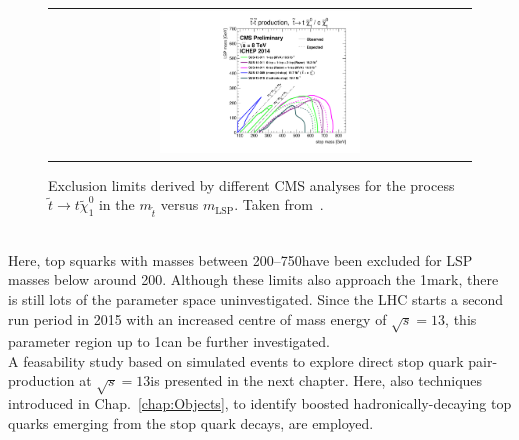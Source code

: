\begin{figure}[!h]
  \centering
  \begin{tabular}{c}
                \includegraphics[width=0.49\textwidth]{figures/T2tt_ICHEP2014_All.pdf} 
  \end{tabular}
\caption{Exclusion limits derived by different CMS analyses for the process $\tilde{t} \rightarrow t\tilde{\chi}_1^0$ in the $m_{\tilde{t}}$ versus $m_\mathrm{LSP}$. Taken from~\cite{bib:CMS:PhysicsResultsSUS}.} 
  \label{fig:8TeV_stop_limits}
\end{figure}
\\
Here, top squarks with masses between 200--750\gev have been excluded for LSP masses below around 200\gev. Although these limits also approach the 1\tev mark, there is still lots of the parameter space uninvestigated. Since the LHC starts a second run period in 2015 with an increased centre of mass energy of $\sqrt{s} = 13$\tev, this parameter region up to 1\tev can be further investigated.\\
A feasability study based on simulated events to explore direct stop quark pair-production at $\sqrt{s} = 13$\tev is presented in the next chapter. Here, also techniques introduced in Chap.~\ref{chap:Objects}, to identify boosted hadronically-decaying top quarks emerging from the stop quark decays, are employed.